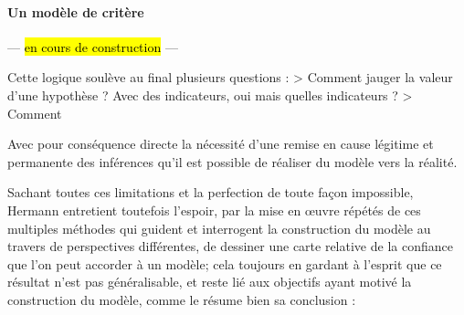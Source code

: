 \paragraph{Un modèle de critère}

--- \hl{en cours de construction} ---

Cette logique soulève au final plusieurs questions :
> Comment jauger la valeur d'une hypothèse ? Avec des indicateurs, oui mais quelles indicateurs ?
> Comment






Avec pour conséquence directe la nécessité d'une remise en cause légitime et permanente des inférences qu'il est possible de réaliser du modèle vers la réalité.



Sachant toutes ces limitations et la perfection de toute façon impossible, Hermann entretient toutefois l'espoir, par la mise en œuvre répétés de ces multiples méthodes qui guident et interrogent la construction du modèle au travers de perspectives différentes, de dessiner une carte relative de la confiance que l'on peut accorder à un modèle; cela toujours en gardant à l'esprit que ce résultat n'est pas généralisable, et reste lié aux objectifs ayant motivé la construction du modèle, comme le résume bien sa conclusion :

